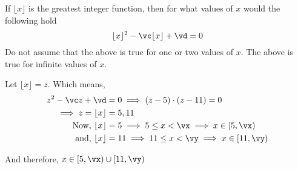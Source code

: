 

\ADD\va\vb\vc
\MULTIPLY\va\vb\vd
\ADD{}\vx
\ADD{}\vy

\question If $\lfloor x\rfloor$ is the greatest integer function, then for what values of $x$ would 
the following hold 
  \[
    \lfloor x\rfloor^2-\vc\lfloor x\rfloor + \vd = 0
  \]
  Do not assume that the above is true for one or two values of $x$. The above is true for infinite values of $x$.


\watchout

\begin{solution}
  Let $\lfloor x\rfloor = z$. Which means,
  \begin{align}
    z^2 -\vc z + \vd &= 0 \implies (z-\va)\cdot (z-\vb) = 0 \\
    \implies z = \lfloor x\rfloor &= \va, \vb \\
    \text{ Now, } \lfloor x\rfloor &= \va \implies \va\leq x <\vx \implies x\in [\va,\vx) \\
    \text{ and, } \lfloor x\rfloor &= \vb \implies \vb\leq x <\vy \implies x\in [\vb,\vy)
  \end{align}

  And therefore, $x\in [\va,\vx)\cup [\vb,\vy)$

\end{solution}

